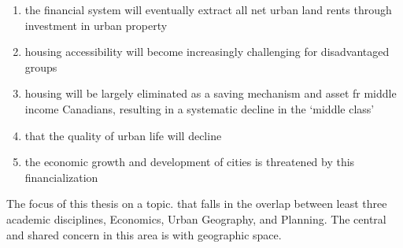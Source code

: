 \begin{enumerate}
\item the financial system will eventually extract all net urban land rents through investment in urban property
\item housing accessibility will become increasingly challenging for disadvantaged groups
\item housing will be largely eliminated as a saving mechanism and asset fr middle income Canadians,  resulting in a systematic decline in the `middle class'
\item that the quality of urban life will decline
\item the economic growth and development of cities is threatened by this financialization
\end{enumerate}


The focus of this thesis on a topic. that falls in the overlap  between least three academic  disciplines, Economics, Urban Geography, and Planning. The central and shared concern in this area is with geographic space.




